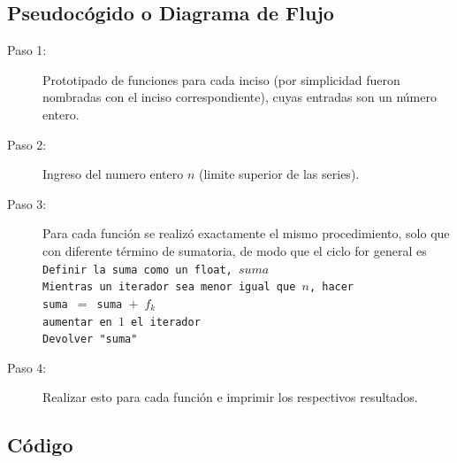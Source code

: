 \subsection{Pseudocógido o Diagrama de Flujo}
\begin{description}
	\item[Paso 1: ] Prototipado de funciones para cada inciso (por simplicidad fueron nombradas con el inciso correspondiente), cuyas entradas son un número entero.
	\item[Paso 2: ] Ingreso del numero entero $n$ (limite superior de las series).
	\item[Paso 3: ] Para cada función se realizó exactamente el mismo procedimiento, solo que con diferente término de sumatoria, de modo que el ciclo for general es \\
	\texttt{Definir la suma como un float, $suma$} \\
	\texttt{Mientras un iterador sea menor igual que $n$, hacer}\\
	\texttt{suma $=$ suma $+$ $f_k$}\\
	\texttt{aumentar en $1$ el iterador}\\
	\texttt{Devolver "suma"}
	\item[Paso 4: ] Realizar esto para cada función e imprimir los respectivos resultados.
\end{description}


\subsection{Código}














